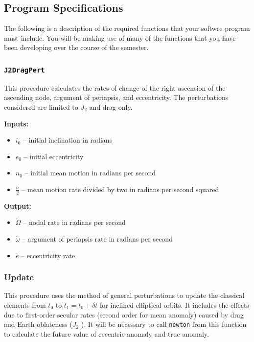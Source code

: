 \documentclass[11pt, reqno]{article}    %
\begin{document}
\subsection*{Program Specifications}
The following is a description of the required functions that your softwre program must include.
You will be making use of many of the functions that you have been developing over the course of the semester.

\subsubsection*{\texttt{J2DragPert}}

This procedure calculates the rates of change of the right ascension of the ascending node, argument of periapsis, and eccentricity.
The perturbations considered are limited to \( J_2 \) and drag only.

\noindent \textbf{Inputs: }
\begin{itemize}
    \item \( i_0 \) -- initial inclination in radians
    \item \( e_0 \) -- initial eccentricity
    \item \( n_0 \) -- initial mean motion in radians per second
    \item \( \frac{\dot{n}}{2} \) -- mean motion rate divided by two in radians per second squared
\end{itemize}

\noindent\textbf{Output: }
\begin{itemize}
    \item \( \dot{\Omega} \) -- nodal rate in radians per second
    \item \( \dot{\omega} \) -- argument of periapsis rate in radians per second
    \item \( \dot{e} \) -- eccentricity rate
\end{itemize}

\subsubsection*{Update}
This procedure uses the method of general perturbations to update the classical elements from \( t_0 \) to \( t_1 = t_0 + \delta t \) for inclined elliptical orbits.
It includes the effects due to first-order secular rates (second order for mean anomaly) caused by drag and Earth oblateness (\( J_2 \) ). 
It will be necessary to call \texttt{newton} from this function to calculate the future value of eccentric anomaly and true anomaly.
\end{document}
